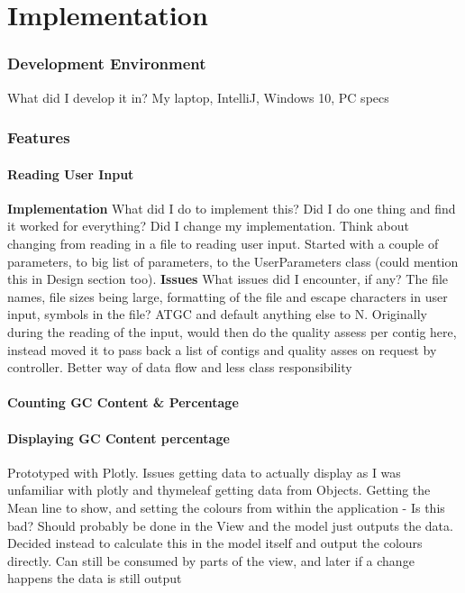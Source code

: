 \chapter{Implementation}
\subsection{Development Environment}
What did I develop it in? My laptop, IntelliJ, Windows 10, PC specs

\subsection{Features}
\subsubsection{Reading User Input}
\textbf{Implementation}
What did I do to implement this? Did I do one  thing and find it worked for everything? Did I change my implementation. Think about changing from reading in a file to reading user input. Started with a couple of parameters, to big list of parameters, to the UserParameters class (could mention this in Design section too).
\textbf{Issues}
What issues did I encounter, if any? The file names, file sizes being large, formatting of the file and escape characters in user input, symbols in the file? ATGC and default anything else to N. Originally during the reading of the input, would then do the quality assess per contig here, instead moved it to pass back a list of contigs and quality asses on request by controller. Better way of data flow and less class responsibility

\subsubsection{Counting GC Content \& Percentage}

\subsubsection{Displaying GC Content percentage}
Prototyped with Plotly. Issues getting data to actually display as I was unfamiliar with plotly and thymeleaf getting data from Objects.
Getting the Mean line to show, and setting the colours from within the application - Is this bad? Should probably be done in the View and the model just outputs the data. Decided instead to calculate this in the model itself and output the colours directly. Can still be consumed by parts of the view, and later if a change happens the data is still output

